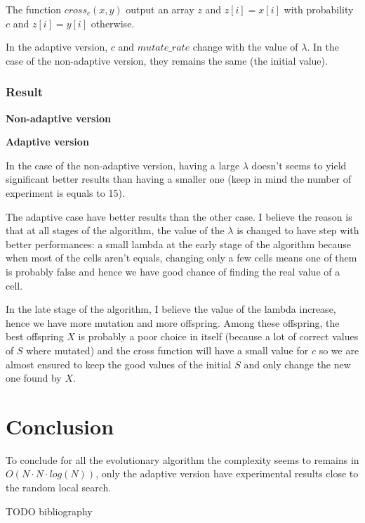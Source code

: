 \documentclass[12pt]{article}
\theoremstyle{definition}
\theoremstyle{plain}
\theoremstyle{remark}
\begin{document}
The function $cross_c(x, y)$ output an array $z$ and $z[i] = x[i]$ with probability $c$ and $z[i] = y[i]$ otherwise.

In the adaptive version, $c$ and $mutate\_rate$ change with the value of $\lambda$. In the case of the non-adaptive version, they remains the same (the initial value).

\subsubsection{Result}

\textbf{Non-adaptive version}


\textbf{Adaptive version}


In the case of the non-adaptive version, having a large $\lambda$ doesn't seems to yield significant better results than having a smaller one (keep in mind the number of experiment is equals to 15).

The adaptive case have better results than the other case. I believe the reason is that at all stages of the algorithm, the value of the $\lambda$ is changed to have step with better performances: a small lambda at the early stage of the algorithm because when most of the cells aren't equals, changing only a few cells means one of them is probably false and hence we have good chance of finding the real value of a cell.

In the late stage of the algorithm, I believe the value of the lambda increase, hence we have more mutation and more offspring. Among these offspring, the best offspring $X$ is probably a poor choice in itself (because a lot of correct values of $S$ where mutated) and the cross function will have a small value for $c$ so we are almost ensured to keep the good values of the initial $S$ and only change the new one found by $X$.

\section{Conclusion}
To conclude for all the evolutionary algorithm the complexity seems to remains in $O(N \cdot N \cdot log(N))$, only the adaptive version have experimental results close to the random local search.

TODO bibliography
\end{document}
